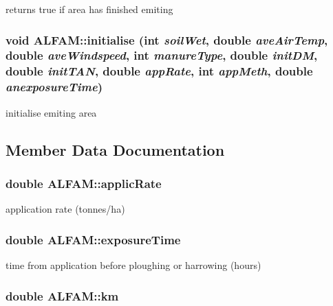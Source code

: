 returns true if area has finished emiting \hypertarget{class_a_l_f_a_m_ae4afb7f15146779a48856bc9c2b6998c}{
\subsubsection[{initialise}]{\setlength{\rightskip}{0pt plus 5cm}void ALFAM::initialise (int {\em soilWet}, \/  double {\em aveAirTemp}, \/  double {\em aveWindspeed}, \/  int {\em manureType}, \/  double {\em initDM}, \/  double {\em initTAN}, \/  double {\em appRate}, \/  int {\em appMeth}, \/  double {\em anexposureTime})}}
\label{class_a_l_f_a_m_ae4afb7f15146779a48856bc9c2b6998c}


initialise emiting area 

\subsection{Member Data Documentation}
\hypertarget{class_a_l_f_a_m_a769eebe5366f8aeb9d1fec89e25b700d}{
\subsubsection[{applicRate}]{\setlength{\rightskip}{0pt plus 5cm}double {\bf ALFAM::applicRate}}}
\label{class_a_l_f_a_m_a769eebe5366f8aeb9d1fec89e25b700d}


application rate (tonnes/ha) \hypertarget{class_a_l_f_a_m_a81ec0b0c6ed35efb1eaf48361ce984ff}{
\subsubsection[{exposureTime}]{\setlength{\rightskip}{0pt plus 5cm}double {\bf ALFAM::exposureTime}}}
\label{class_a_l_f_a_m_a81ec0b0c6ed35efb1eaf48361ce984ff}


time from application before ploughing or harrowing (hours) \hypertarget{class_a_l_f_a_m_a626af05172d7fc201f02eedcce3a6956}{
\subsubsection[{km}]{\setlength{\rightskip}{0pt plus 5cm}double {\bf ALFAM::km}}}
\label{class_a_l_f_a_m_a626af05172d7fc201f02eedcce3a6956}


